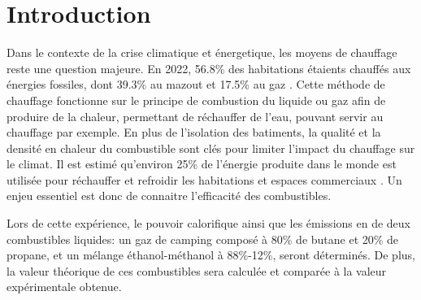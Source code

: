 \section{Introduction}

Dans le contexte de la crise climatique et énergetique, les moyens de chauffage reste une question majeure. En 2022, 56.8\% des habitations étaients chauffés aux énergies fossiles, dont 39.3\% au mazout et 17.5\% au gaz \cite{chauffage}. Cette méthode de chauffage fonctionne sur le principe de combustion du liquide ou gaz afin de produire de la chaleur, permettant de réchauffer de l'eau, pouvant servir au chauffage par exemple. En plus de l'isolation des batiments, la qualité et la densité en chaleur du combustible sont clés pour limiter l'impact du chauffage sur le climat. Il est estimé qu'environ 25\% de l'énergie produite dans le monde est utilisée pour réchauffer et refroidir les habitations et espaces commerciaux \cite{energie-chauffage}. Un enjeu essentiel est donc de connaitre l'efficacité des combustibles.

Lors de cette expérience, le pouvoir calorifique ainsi que les émissions en  de deux combustibles liquides: un gaz de camping composé à 80\% de butane et 20\% de propane, et un mélange éthanol-méthanol à 88\%-12\%, seront déterminés. De plus, la valeur théorique de ces combustibles sera calculée et comparée à la valeur expérimentale obtenue.